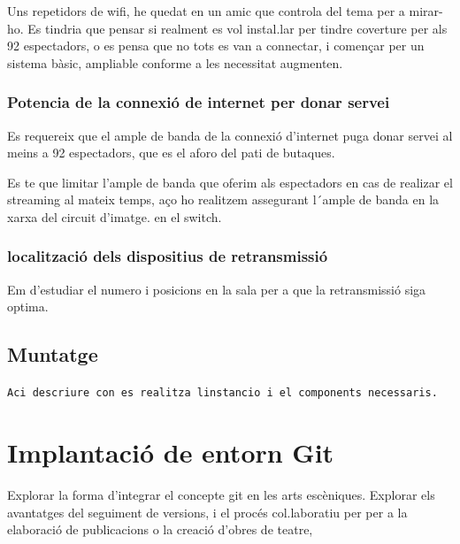 \documentclass[
  10pt,
]{krantz}
\begin{document}
Uns repetidors de wifi, he quedat en un amic que controla del tema per a mirar-ho. Es tindria que pensar si realment es vol instal.lar per tindre coverture per als 92 espectadors, o es pensa que no tots es van a connectar, i començar per un sistema bàsic, ampliable conforme a les necessitat augmenten.

\hypertarget{potencia-de-la-connexiuxf3-de-internet-per-donar-servei}{%
\subsection{Potencia de la connexió de internet per donar servei}\label{potencia-de-la-connexiuxf3-de-internet-per-donar-servei}}

Es requereix que el ample de banda de la connexió d'internet puga donar servei al meins a 92 espectadors, que es el aforo del pati de butaques.

Es te que limitar l'ample de banda que oferim als espectadors en cas de realizar el streaming al mateix temps, aço ho realitzem assegurant l´ample de banda en la xarxa del circuit d'imatge. en el switch.

\hypertarget{localitzaciuxf3-dels-dispositius-de-retransmissiuxf3}{%
\subsection{localització dels dispositius de retransmissió}\label{localitzaciuxf3-dels-dispositius-de-retransmissiuxf3}}

Em d'estudiar el numero i posicions en la sala per a que la retransmissió siga optima.

\hypertarget{muntatge-1}{%
\section{Muntatge}\label{muntatge-1}}

\texttt{Aci\ descriure\ con\ es\ realitza\ l\textquotesingle{}instancio\ i\ el\ components\ necessaris.}

\hypertarget{implantaciuxf3-de-entorn-git}{%
\chapter{Implantació de entorn Git}\label{implantaciuxf3-de-entorn-git}}

Explorar la forma d'integrar el concepte git en les arts escèniques. Explorar els avantatges del seguiment de versions, i el procés col.laboratiu per per a la elaboració de publicacions o la creació d'obres de teatre,
\end{document}
